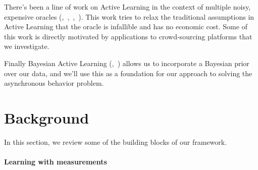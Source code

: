 There's been a line of work on Active Learning in the context of multiple noisy, expensive oracles (\cite{yan2011active},~\cite{donmez2008proactive},~\cite{golovin2010near},~\cite{vijayanarasimhan2014large}).
This work tries to relax the traditional assumptions in Active Learning that the oracle is infallible and has no economic cost.
Some of this work is directly motivated by applications to crowd-sourcing platforms that we investigate.


Finally Bayesian Active Learning (\cite{golovin2010near},~\cite{tong2000active}) allows us to incorporate a Bayesian prior over our data, and we'll use this as a foundation for our approach to solving the asynchronous behavior problem.


\section{Background}
\label{sec:background}

In this section, we review some of the building blocks of our framework.

\paragraph{Learning with measurements}


